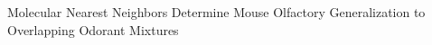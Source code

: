 Molecular Nearest Neighbors Determine Mouse Olfactory Generalization to Overlapping Odorant Mixtures